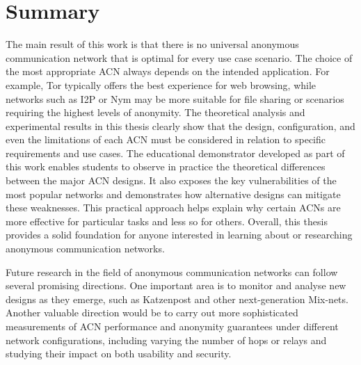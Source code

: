 \chapter{Summary}

The main result of this work is that there is no universal anonymous communication network that is optimal for every use case scenario. The choice of the most appropriate ACN always depends on the intended application. For example, Tor typically offers the best experience for web browsing, while networks such as I2P or Nym may be more suitable for file sharing or scenarios requiring the highest levels of anonymity. The theoretical analysis and experimental results in this thesis clearly show that the design, configuration, and even the limitations of each ACN must be considered in relation to specific requirements and use cases.
The educational demonstrator developed as part of this work enables students to observe in practice the theoretical differences between the major ACN designs. It also exposes the key vulnerabilities of the most popular networks and demonstrates how alternative designs can mitigate these weaknesses. This practical approach helps explain why certain ACNs are more effective for particular tasks and less so for others.
Overall, this thesis provides a solid foundation for anyone interested in learning about or researching anonymous communication networks.

Future research in the field of anonymous communication networks can follow several promising directions. One important area is to monitor and analyse new designs as they emerge, such as Katzenpost and other next-generation Mix-nets. Another valuable direction would be to carry out more sophisticated measurements of ACN performance and anonymity guarantees under different network configurations, including varying the number of hops or relays and studying their impact on both usability and security.
